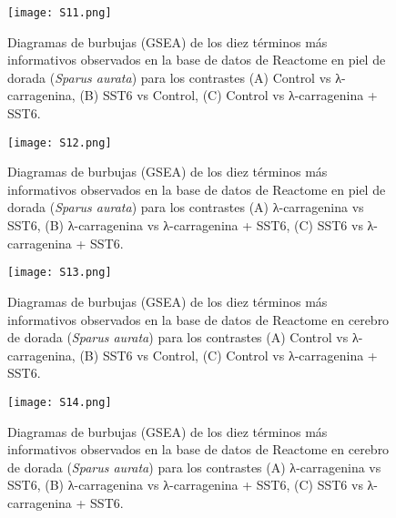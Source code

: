 \documentclass[10pt,a4paper]{article}
\begin{document}
\begin{figure}[ht]
  \centering
  \texttt{[image: S11.png]}%
  \caption[Diagramas GSEA]{%
	Diagramas de burbujas (GSEA) de los diez términos más informativos observados en la base de datos de Reactome en piel de dorada (\textit{Sparus aurata}) para los contrastes (A) Control vs λ-carragenina, (B) SST6 vs Control, (C) Control vs λ-carragenina + SST6.
 }
  \label{fig:S13}
\end{figure}


\begin{figure}[ht]
  \centering
  \texttt{[image: S12.png]}%
  \caption[Diagramas GSEA]{%
	Diagramas de burbujas (GSEA) de los diez términos más informativos observados en la base de datos de Reactome en piel de dorada (\textit{Sparus aurata}) para los contrastes (A) λ-carragenina vs SST6, (B) λ-carragenina vs λ-carragenina + SST6, (C) SST6 vs λ-carragenina + SST6.
 }
  \label{fig:S14}
\end{figure}


\begin{figure}[ht]
  \centering
  \texttt{[image: S13.png]}%
  \caption[Diagramas GSEA]{%
	Diagramas de burbujas (GSEA) de los diez términos más informativos observados en la base de datos de Reactome en cerebro de dorada (\textit{Sparus aurata}) para los contrastes (A) Control vs λ-carragenina, (B) SST6 vs Control, (C) Control vs λ-carragenina + SST6.
 }
  \label{fig:S15}
\end{figure}


\begin{figure}[ht]
  \centering
  \texttt{[image: S14.png]}%
  \caption[Diagramas GSEA]{%
	Diagramas de burbujas (GSEA) de los diez términos más informativos observados en la base de datos de Reactome en cerebro de dorada  (\textit{Sparus aurata}) para los contrastes (A) λ-carragenina vs SST6, (B) λ-carragenina vs λ-carragenina + SST6, (C) SST6 vs λ-carragenina + SST6.
 }
  \label{fig:S16}
\end{figure}
\end{document}
